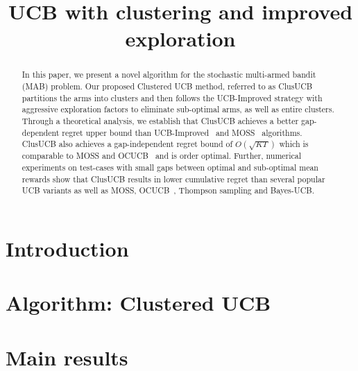 \documentclass{article}
\title{UCB with clustering and improved exploration}
\begin{document}

\maketitle

\begin{abstract}
In this paper, we present a novel algorithm for the stochastic multi-armed bandit (MAB) problem. Our proposed Clustered UCB method, referred to as ClusUCB partitions the arms into clusters and then follows the UCB-Improved strategy with aggressive exploration factors to eliminate sub-optimal arms, as well as entire clusters. Through a theoretical analysis, we establish that ClusUCB achieves a better gap-dependent regret upper bound than UCB-Improved~\cite{auer2010ucb} and MOSS~\cite{audibert2009minimax} algorithms. ClusUCB also achieves a gap-independent regret bound of $O\left(\sqrt{KT}\right)$ which is comparable to MOSS and OCUCB~\cite{lattimore2016optimally} and is order optimal. Further, numerical experiments on test-cases with small gaps between optimal and sub-optimal mean rewards show that ClusUCB results in lower cumulative regret than several popular UCB variants as well as MOSS, OCUCB~\cite{lattimore2015optimally}, Thompson sampling and Bayes-UCB\cite{kaufmann2012bayesian}. 

\end{abstract}

\section{Introduction}
\label{sec:intro}


\section{Algorithm: Clustered UCB}
\label{sec:clusucb}


\section{Main results}
\label{sec:results}

\end{document}
